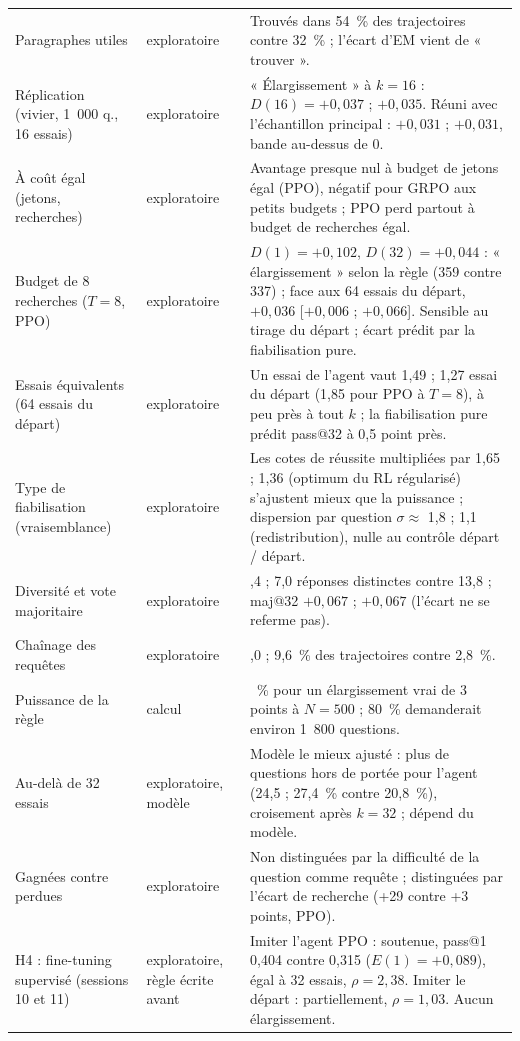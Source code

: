 \documentclass[11pt,a4paper]{article}
\begin{document}
\begin{table}[h]
\begin{tabular}{>{\raggedright\arraybackslash}p{3.6cm}>{\raggedright\arraybackslash}p{1.9cm}>{\raggedright\arraybackslash}p{8.6cm}}
Paragraphes utiles & exploratoire & Trouvés dans 54~\% des trajectoires contre 32~\% ; l'écart d'EM vient de « trouver ». \\
Réplication (vivier, 1~000 q., 16 essais) & exploratoire & « Élargissement » à $k = 16$ : $D(16) = +0{,}037$ ; $+0{,}035$. Réuni avec l'échantillon principal : $+0{,}031$ ; $+0{,}031$, bande au-dessus de 0. \\
À coût égal (jetons, recherches) & exploratoire & Avantage presque nul à budget de jetons égal (PPO), négatif pour GRPO aux petits budgets ; PPO perd partout à budget de recherches égal. \\
Budget de 8 recherches ($T = 8$, PPO) & exploratoire & $D(1) = +0{,}102$, $D(32) = +0{,}044$ : « élargissement » selon la règle (359 contre 337) ; face aux 64 essais du départ, $+0{,}036$ [$+0{,}006$ ; $+0{,}066$]. Sensible au tirage du départ ; écart prédit par la fiabilisation pure. \\
Essais équivalents (64 essais du départ) & exploratoire & Un essai de l'agent vaut 1,49 ; 1,27 essai du départ (1,85 pour PPO à $T = 8$), à peu près à tout $k$ ; la fiabilisation pure prédit pass@32 à 0,5 point près. \\
Type de fiabilisation (vraisemblance) & exploratoire & Les cotes de réussite multipliées par 1,65 ; 1,36 (optimum du RL régularisé) s'ajustent mieux que la puissance ; dispersion par question $\sigma \approx$ 1,8 ; 1,1 (redistribution), nulle au contrôle départ / départ. \\
Diversité et vote majoritaire & exploratoire & 5,4 ; 7,0 réponses distinctes contre 13,8 ; maj@32 $+0{,}067$ ; $+0{,}067$ (l'écart ne se referme pas). \\
Chaînage des requêtes & exploratoire & 19,0 ; 9,6~\% des trajectoires contre 2,8~\%. \\
Puissance de la règle & calcul & 25~\% pour un élargissement vrai de 3 points à $N = 500$ ; 80~\% demanderait environ 1~800 questions. \\
Au-delà de 32 essais & exploratoire, modèle & Modèle le mieux ajusté : plus de questions hors de portée pour l'agent (24,5 ; 27,4~\% contre 20,8~\%), croisement après $k = 32$ ; dépend du modèle. \\
Gagnées contre perdues & exploratoire & Non distinguées par la difficulté de la question comme requête ; distinguées par l'écart de recherche (+29 contre +3 points, PPO). \\
H4 : fine-tuning supervisé (sessions 10 et 11) & exploratoire, règle écrite avant & Imiter l'agent PPO : soutenue, pass@1 0,404 contre 0,315 ($E(1) = +0{,}089$), égal à 32 essais, $\rho = 2{,}38$. Imiter le départ : partiellement, $\rho = 1{,}03$. Aucun élargissement. \\

\end{tabular}
\end{table}
\end{document}
